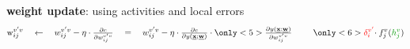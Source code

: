 \begin{frame}
\begin{enumerate}
{		\item[] \textbf {weight update}: using activities and local errors
        \begin{equation}
				\mathrm{w}_{ij}^{v'v}
				\quad \leftarrow \quad 
				{w}_{ij}^{v'v} - \eta \cdot
				\smallfrac{\partial e}{\partial{w}_{ij}^{v'v}}
				\quad=\quad {w}_{ij}^{v'v} - \eta \cdot
				\smallfrac{\partial e}{\partial y(\vec{x}; \vec{w})} \cdot
				\only<5>{
				\smallfrac{\partial y(\vec{x}; \vec{w})}{\partial{w}_{ij}^{v'v}}\hspace{8.5mm}
				}
                \slidesonly{
				\only<6>{
				{\color{red} \delta_i^{v'}} \kern-.5ex\cdot
			   			f_j^v( {\color{darkgreen}h_j^v} )
			   	}}
        \end{equation}
			}
	\end{enumerate}
    
\end{frame}

